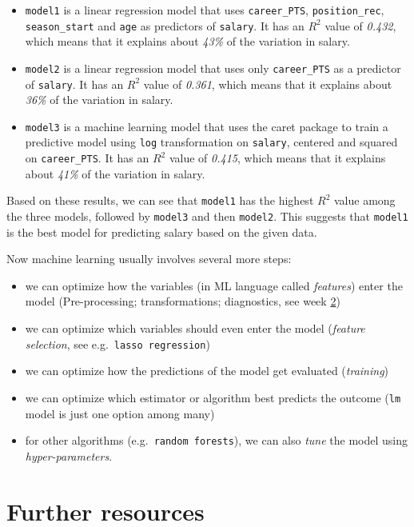 \documentclass[
]{book}
\begin{document}
\begin{itemize}
\item
  \texttt{model1} is a linear regression model that uses \texttt{career\_PTS}, \texttt{position\_rec}, \texttt{season\_start} and \texttt{age} as predictors of \texttt{salary}. It has an \(R^2\) value of \emph{0.432}, which means that it explains about \emph{43\%} of the variation in salary.
\item
  \texttt{model2} is a linear regression model that uses only \texttt{career\_PTS} as a predictor of \texttt{salary}. It has an \(R^2\) value of \emph{0.361}, which means that it explains about \emph{36\%} of the variation in salary.
\item
  \texttt{model3} is a machine learning model that uses the caret package to train a predictive model using \texttt{log} transformation on \texttt{salary}, centered and squared on \texttt{career\_PTS}. It has an \(R^2\) value of \emph{0.415}, which means that it explains about \emph{41\%} of the variation in salary.
\end{itemize}

Based on these results, we can see that \texttt{model1} has the highest \(R^2\) value among the three models, followed by \texttt{model3} and then \texttt{model2}. This suggests that \texttt{model1} is the best model for predicting salary based on the given data.

Now machine learning usually involves several more steps:

\begin{itemize}
\item
  we can optimize how the variables (in ML language called \emph{features}) enter the model (Pre-processing; transformations; diagnostics, see week \protect\hyperlink{eda-1}{2})
\item
  we can optimize which variables should even enter the model (\emph{feature selection}, see e.g.~\texttt{lasso\ regression})
\item
  we can optimize how the predictions of the model get evaluated (\emph{training})
\item
  we can optimize which estimator or algorithm best predicts the outcome (\texttt{lm} model is just one option among many)
\item
  for other algorithms (e.g.~\texttt{random\ forests}), we can also \emph{tune} the model using \emph{hyper-parameters}.
\end{itemize}

\hypertarget{further-resources-7}{%
\section{Further resources}\label{further-resources-7}}
\end{document}

